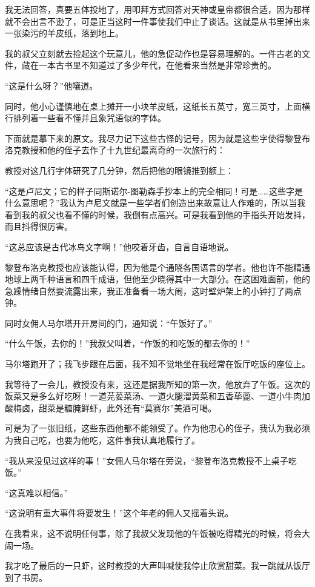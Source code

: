 \documentclass[10pt]{book}
\begin{document}
我无法回答，真要五体投地了，用叩拜方式回答对天神或皇帝都很合适，因为那样就不会出言不逊了，可是正当这时一件事使我们中止了谈话。这就是从书里掉出来一张染污的羊皮纸，落到地上。

我的叔父立刻就去捡起这个玩意儿，他的急促动作也是容易理解的。一件古老的文件，藏在一本古书里不知道过了多少年代，在他看来当然是非常珍贵的。

“这是什么呀？”他嚷道。

同时，他小心谨慎地在桌上摊开一小块羊皮纸，这纸长五英寸，宽三英寸，上面横行排列着一些看不懂并且象咒语似的字体。

下面就是摹下来的原文。我尽力记下这些古怪的记号，因为就是这些字使得黎登布洛克教授和他的侄子去作了十九世纪最离奇的一次旅行的：

教授对这几行字体研究了几分钟，然后把他的眼镜推到额上：

“这是卢尼文；它的样子同斯诺尔-图勒森手抄本上的完全相同！可是……这些字是什么意思呢？”我认为卢尼文就是一些学者们创造出来故意让人作难的，所以当我看到我的叔父也看不懂的时候，我倒有点高兴。可是我看到他的手指头开始发抖，而且抖得很厉害。

“这总应该是古代冰岛文字啊！”他咬着牙齿，自言自语地说。

黎登布洛克教授也应该能认得，因为他是个通晓各国语言的学者。他也许不能精通地球上两千种语言和四千成语，但他至少晓得其中一大部分。在这困难面前，他的急躁情绪自然要流露出来，我正准备看一场大闹，这时壁炉架上的小钟打了两点钟。

同时女佣人马尔塔开开房间的门，通知说：“午饭好了。”

“什么午饭，去你的！”我叔父叫着，“作饭的和吃饭的都去你的！”

马尔塔跑开了；我飞步跟在后面，我不知不觉地坐在我经常在饭厅吃饭的座位上。

我等待了一会儿，教授没有来，这还是据我所知的第一次，他放弃了午饭。这次的饭菜又是多么好吃呀！一道芫荽菜汤、一道火腿溜黄菜和五香荜蓖、一道小牛肉加酸梅卤，甜菜是糖腌鲜虾，此外还有“莫赛尔”美酒可喝。

可是为了一张旧纸，这些东西他都不能领受了。作为他忠心的侄子，我认为我必须为我自己吃，也要为他吃，这件事我认真地履行了。

“我从来没见过这样的事！”女佣人马尔塔在旁说，“黎登布洛克教授不上桌子吃饭。”

“这真难以相信。”

“这说明有重大事件将要发生！”这个年老的佣人又摇着头说。

在我看来，这不说明任何事，除了我叔父发现他的午饭被吃得精光的时候，将会大闹一场。

我才吃了最后的一只虾，这时教授的大声叫喊使我停止欣赏甜菜。我一跳就从饭厅到了书房。
\end{document}
